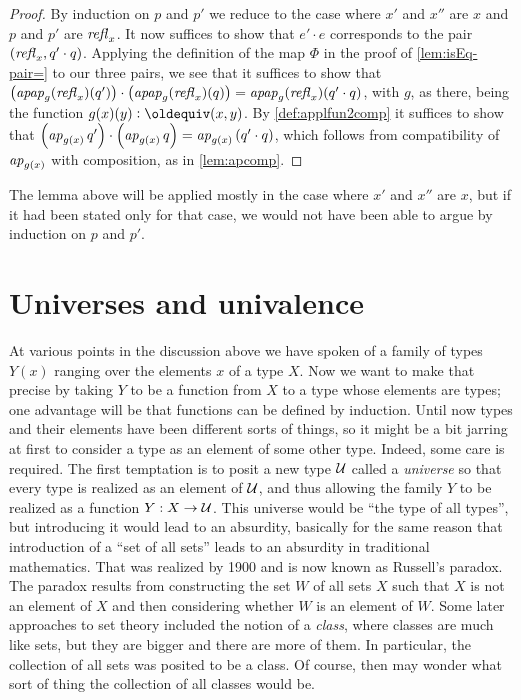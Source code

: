 \begin{proof}
  By induction on $p$ and $p'$ we reduce to the case where $x'$ and $x''$ are $x$ and $p$ and $p'$ are $\mathop{{\it refl}_{x}}$. 
  It now suffices to show that $e' \cdot e$ corresponds to the pair $(\mathop{{\it refl}_{x}} , q' \cdot q)$.
  Applying the definition of the map $\Phi$ in the proof of \cref{lem:isEq-pair=} to our three pairs, we see that it suffices to show that
  $\left( \mathop{{\it apap}_{g}(\mathop{{\it refl}_{x}})(q')} \right) \cdot \left( \mathop{{\it apap}_{g}(\mathop{{\it refl}_{x}})(q)} \right) = \mathop{{\it apap}_{g}(\mathop{{\it refl}_{x}})(q' \cdot q)}$, with $g$, as there, being the function $ g(x)(y) \defeq (x,y)$.
  By \cref{def:applfun2comp} it suffices to show that $\left( \mathop{{\it ap}_{g(x)}} {q'} \right) \cdot \left( \mathop{{\it ap}_{g(x)}} {q} \right) = \mathop{{\it ap}_{g(x)}} {(q' \cdot q)}$, which follows from
  compatibility of $\mathop{{\it ap}_{g(x)}}$ with composition, as in \cref{lem:apcomp}.
\end{proof}

The lemma above will be applied mostly in the case where $x'$ and $x''$ are $x$, but if it had been stated only for that case, we would not have
been able to argue by induction on $p$ and $p'$.

\section{Universes and univalence}\label{sec:univax}

At various points in the discussion above we have spoken of a family of types $Y(x)$ ranging over the elements $x$ of a type $X$.  Now we want
to make that precise by taking $Y$ to be a function from $X$ to a type whose elements are types; one advantage will be that functions can be
defined by induction.  Until now types and their elements have been different sorts of things, so it might be a bit jarring at first to consider
a type as an element of some other type. Indeed, some care is required.  The first temptation is to posit a new type $\mathcal{U}$ called a {\em
  universe} so that every type is realized as an element of $\mathcal{U}$, and thus allowing the family $Y$ to be realized as a function $Y : X \to
\mathcal{U}$.  This universe would be ``the type of all types'', but introducing it would lead to an absurdity, basically for the same reason that
introduction of a ``set of all sets'' leads to an absurdity in traditional mathematics.  That was realized by 1900 and is now known as Russell's
paradox.  The paradox results from constructing the set $W$ of all sets $X$ such that $X$ is not an element of $X$ and then considering whether
$W$ is an element of $W$.  Some later approaches to set theory included the notion of a {\em class}, where classes are much like sets, but they
are bigger and there are more of them.  In particular, the collection of all sets was posited to be a class.  Of course, then may wonder what
sort of thing the collection of all classes would be.

